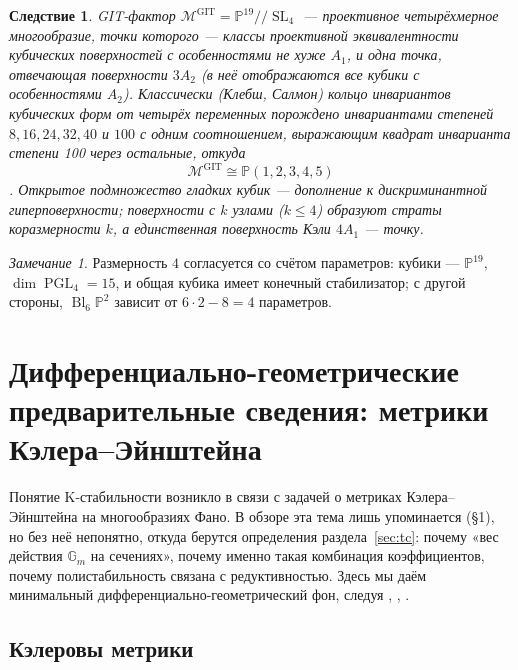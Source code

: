 \documentclass[11pt,a4paper]{article}
\theoremstyle{plain}
\newtheorem{corollary}[theorem]{Следствие}
\theoremstyle{definition}
\theoremstyle{remark}
\newtheorem{remark}[theorem]{Замечание}
\newcommand{\PP}{\mathbb{P}}
\newcommand{\Gm}{\mathbb{G}_m}
\newcommand{\cM}{\mathcal{M}}
\DeclareMathOperator{\Bl}{Bl}
\DeclareMathOperator{\SL}{SL}
\DeclareMathOperator{\PGL}{PGL}
\begin{document}
\begin{corollary}\label{cor:GIT-cubic}
GIT-фактор $\cM^{\mathrm{GIT}}=\PP^{19}/\!/\SL_4$ --- проективное четырёхмерное многообразие, точки
которого --- классы проективной эквивалентности кубических поверхностей с особенностями не хуже
$A_1$, и одна точка, отвечающая поверхности $3A_2$ \textup{(}в неё отображаются все кубики с особенностями
$A_2$\textup{)}. Классически \textup{(}Клебш, Салмон\textup{)} кольцо инвариантов кубических форм от четырёх переменных
порождено инвариантами степеней $8,16,24,32,40$ и $100$ с одним соотношением, выражающим квадрат
инварианта степени 100 через остальные, откуда
\[
\cM^{\mathrm{GIT}}\cong\PP(1,2,3,4,5)
\]
\cite[\S\,10]{Dolg-IT}. Открытое подмножество гладких кубик --- дополнение к дискриминантной
гиперповерхности; поверхности с $k$ узлами \textup{(}$k\le4$\textup{)} образуют страты коразмерности $k$, а единственная
поверхность Кэли $4A_1$ --- точку.
\end{corollary}

\begin{remark}
Размерность $4$ согласуется со счётом параметров: кубики --- $\PP^{19}$, $\dim\PGL_4=15$, и
общая кубика имеет конечный стабилизатор; с другой стороны, $\Bl_6\PP^2$ зависит от
$6\cdot2-8=4$ параметров.
\end{remark}

\section{Дифференциально-геометрические предварительные сведения: метрики Кэлера--Эйнштейна}\label{sec:dg}

Понятие K-стабильности возникло в связи с задачей о метриках Кэлера--Эйнштейна на многообразиях Фано. В обзоре
\cite{DeV} эта тема лишь упоминается (\S1), но без неё непонятно, откуда берутся определения
раздела~\ref{sec:tc}: почему «вес действия $\Gm$ на сечениях», почему именно такая комбинация
коэффициентов, почему полистабильность связана с редуктивностью. Здесь мы даём минимальный
дифференциально-геометрический фон, следуя \cite{Sz}, \cite{Tian-book}, \cite[гл.~0, 1]{GH}.

\subsection{Кэлеровы метрики}
\end{document}
